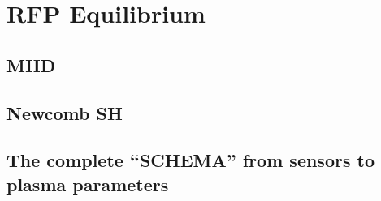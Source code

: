 \chapter{RFP Equilibrium}
\section{MHD}
\section{Newcomb SH}
\section{The complete “SCHEMA” from sensors to plasma parameters}
